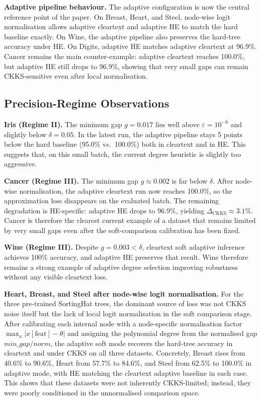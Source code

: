 \documentclass[runningheads]{llncs}
\begin{document}
\textbf{Adaptive pipeline behaviour.}  The adaptive configuration is now the
central reference point of the paper.  On Breast, Heart, and Steel,
node-wise logit normalisation allows adaptive cleartext and adaptive HE to
match the hard baseline exactly.  On Wine, the adaptive pipeline also
preserves the hard-tree accuracy under HE.  On Digits, adaptive HE matches
adaptive cleartext at 96.9\%.  Cancer remains the main counter-example:
adaptive cleartext reaches 100.0\%, but adaptive HE still drops to 96.9\%,
showing that very small gaps can remain CKKS-sensitive even after local
normalisation.

\subsection{Precision-Regime Observations}

\textbf{Iris (Regime II).}  The minimum gap $g = 0.017$ lies well above
$\varepsilon = 10^{-6}$ and slightly below $\delta = 0.05$.  In the latest
run, the adaptive pipeline stays 5 points below the hard baseline
(95.0\% vs.\ 100.0\%) both in cleartext and in HE.  This suggests that, on
this small batch, the current degree heuristic is slightly too aggressive.

\textbf{Cancer (Regime III).}  The minimum gap $g \approx 0.002$ is far
below $\delta$.  After node-wise normalisation, the adaptive cleartext run
now reaches 100.0\%, so the approximation loss disappears on the evaluated
batch.  The remaining degradation is HE-specific: adaptive HE drops to
96.9\%, yielding $\Delta_{\mathrm{CKKS}} \approx 3.1\%$.  Cancer is
therefore the clearest current example of a dataset that remains limited by
very small gaps even after the soft-comparison calibration has been fixed.

\textbf{Wine (Regime III).}  Despite $g = 0.003 < \delta$, cleartext soft
adaptive inference achieves 100\% accuracy, and adaptive HE preserves that
result.  Wine therefore remains a strong example of adaptive degree
selection improving robustness without any visible cleartext loss.

\textbf{Heart, Breast, and Steel after node-wise logit normalisation.}
For the three pre-trained SortingHat trees, the dominant source of loss was
not CKKS noise itself but the lack of local logit normalisation in the soft
comparison stage.  After calibrating each internal node with a node-specific
normalisation factor $\max_x |x[\mathrm{feat}] - \theta|$ and assigning the
polynomial degree from the normalised gap $\mathit{min\_gap}/\mathit{norm}$,
the adaptive soft mode recovers the hard-tree accuracy in cleartext and under
CKKS on all three datasets.  Concretely, Breast rises from 40.6\% to 90.6\%,
Heart from 57.7\% to 84.6\%, and Steel from 62.5\% to 100.0\% in adaptive
mode, with HE matching the cleartext adaptive baseline in each case.  This
shows that these datasets were not inherently CKKS-limited; instead, they
were poorly conditioned in the unnormalised comparison space.
\end{document}
